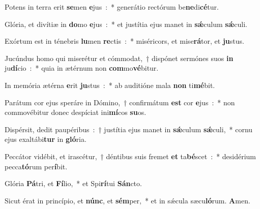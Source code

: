 ﻿\item Potens in terra erit \textbf{se}\-men \textbf{e}\-jus~:~* generátio rectórum be\textbf{ne}\-di\textbf{cé}\-tur.
\item Glória, et divítiæ in \textbf{do}\-mo \textbf{e}\-jus~:~* et justítia ejus manet in \textbf{sǽ}\-culum \textbf{sǽ}\-culi.
\item Exórtum est in ténebris \textbf{lu}\-men \textbf{re}\-ctis~:~* miséricors, et mise\textbf{rá}\-tor, et \textbf{ju}\-stus.
\item Jucúndus homo qui miserétur et cómmodat,~† dispónet sermónes suos \textbf{in} ju\textbf{dí}\-cio~:~* quia in ætérnum non \textbf{com}\-mo\textbf{vé}\-bitur.
\item In memória ætérna \textbf{e}\-rit \textbf{ju}\-stus~:~* ab auditióne mala \textbf{non} ti\textbf{mé}\-bit.
\item Parátum cor ejus speráre in Dómino,~† confirmátum \textbf{est} cor \textbf{e}\-jus~:~* non commovébitur donec despíciat ini\textbf{mí}\-cos \textbf{su}\-os.
\item Dispérsit, dedit paupéribus~:~† justítia ejus manet in \textbf{sǽ}\-culum \textbf{sǽ}\-culi,~* cornu ejus exaltábi\textbf{tur} in \textbf{gló}\-ria.
\item Peccátor vidébit, et irascétur,~† déntibus suis fremet \textbf{et} ta\textbf{bé}\-scet~:~* desidérium pecca\textbf{tó}\-rum per\textbf{í}\-bit.
\item Glória \textbf{Pá}\-tri, et \textbf{Fí}\-lio,~* et Spi\textbf{rí}\-tui \textbf{Sán}\-cto.
\item Sicut érat in princípio, et \textbf{núnc}, et \textbf{sém}\-per,~* et in sǽcula sæcu\textbf{ló}\-rum. \textbf{A}\-men.
